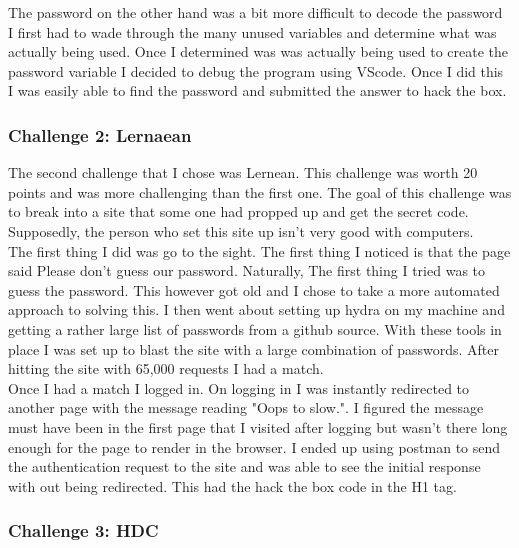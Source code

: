 \documentclass[letterpaper, onecolumn,10pt]{IEEEtran}
\begin{document}
	        The password on the other hand was a bit more difficult to decode the password I first had to wade through the many unused variables and determine what was actually being used. Once I determined was was actually being used to create the password variable I decided to debug the program using VScode. Once I did this I was easily able to find the password and submitted the answer to hack the box.\\
	        
	        \subsubsection{Challenge 2: Lernaean}
	        The second challenge that I chose was Lernean. This challenge was worth 20 points and was more challenging than the first one. The goal of this challenge was to break into a site that some one had propped up and get the secret code. Supposedly, the person who set this site up isn't very good with computers.\\
	        
	        The first thing I did was go to the sight. The first thing I noticed is that the page said Please don't guess our password. Naturally, The first thing I tried was to guess the password. This however got old and I chose to take a more automated approach to solving this. I then went about setting up hydra on my machine and getting a rather large list of passwords from a github source. With these tools in place I was set up to blast the site with a large combination of passwords. After hitting the site with 65,000 requests I had a match.\\
	        
	        Once I had a match I logged in. On logging in I was instantly redirected to another page with the message reading "Oops to slow.". I figured the message must have been in the first page that I visited after logging but wasn't there long enough for the page to render in the browser. I ended up using postman to send the authentication request to the site and was able to see the initial response with out being redirected. This had the hack the box code in the H1 tag.\\
	        
	        \subsubsection{Challenge 3: HDC}
	        
		
		
		
\end{document}

